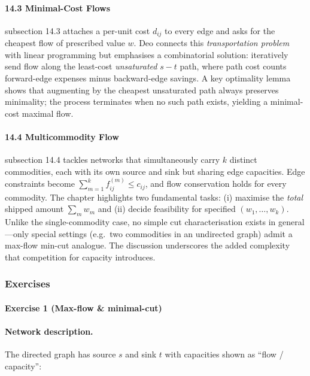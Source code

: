 \documentclass{article}
\theoremstyle{theorem}
\theoremstyle{definition}
\theoremstyle{remark}
\begin{document}
\paragraph*{\textbf{14.3} Minimal-Cost Flows}
subsection 14.3 attaches a per-unit cost \(d_{ij}\) to every edge and asks for the cheapest flow of prescribed value \(w\).  Deo connects this \emph{transportation problem} with linear programming but emphasises a combinatorial solution: iteratively send flow along the least-cost \emph{unsaturated} \(s\!-\!t\) path, where path cost counts forward-edge expenses minus backward-edge savings.  A key optimality lemma shows that augmenting by the cheapest unsaturated path always preserves minimality; the process terminates when no such path exists, yielding a minimal-cost maximal flow. \cite{Deo}

\paragraph*{\textbf{14.4} Multicommodity Flow}
subsection 14.4 tackles networks that simultaneously carry \(k\) distinct commodities, each with its own source and sink but sharing edge capacities.  Edge constraints become \(\sum_{m=1}^{k}f_{ij}^{(m)} \le c_{ij}\), and flow conservation holds for every commodity.  The chapter highlights two fundamental tasks: (i) maximise the \emph{total} shipped amount \(\sum_{m}w_m\) and (ii) decide feasibility for specified \((w_1,\dots,w_k)\).  Unlike the single-commodity case, no simple cut characterisation exists in general—only special settings (e.g.\ two commodities in an undirected graph) admit a max-flow min-cut analogue.  The discussion underscores the added complexity that competition for capacity introduces. \cite{Deo}

\newpage

\subsubsection{Exercises}
\paragraph*{Exercise 1 (Max-flow \& minimal-cut)}

\paragraph{Network description.}
The directed graph has source \(s\) and sink \(t\) with capacities shown as
“flow / capacity”:
\end{document}
